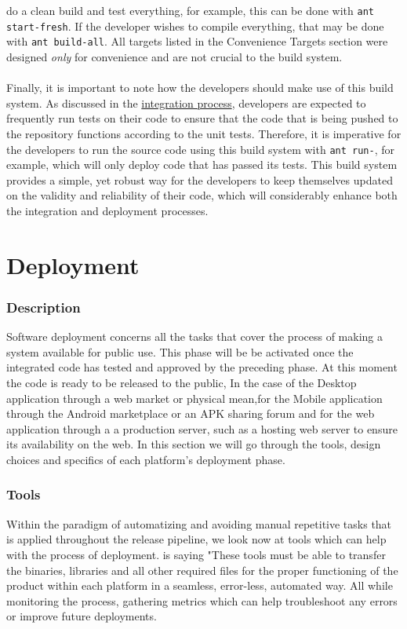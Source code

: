 \documentclass[12pt]{report}
\begin{document}
do a clean build and test everything, for example, this can be done with \texttt{ant start-fresh}.
If the developer wishes to compile everything, that may be done with \texttt{ant build-all}. All
targets listed in the Convenience Targets section were designed \textit{only} for convenience and
are not crucial to the build system.\\\\
Finally, it is important to note how the developers should make use of this build system. As
discussed in the \hyperref[s:integrationprocessrationale]{integration process}, developers are
expected to frequently run tests on their code to ensure that the code that is being pushed to the
repository functions according to the unit tests. Therefore, it is imperative for the developers to
run the source code using this build system with \texttt{ant run-}, for example, which will only
deploy code that has passed its tests. This build system provides a simple, yet robust way for the
developers to keep themselves updated on the validity and reliability of their code, which will
considerably enhance both the integration and deployment processes.
\part{Deployment}
\section{Description}
Software deployment concerns all the tasks that cover the process of making a system available for public use.
This phase will be be activated once the integrated code has tested and approved by the preceding
phase. At this moment the code is ready to be released to the public, In the case of the Desktop
application through a web market or physical mean,for the Mobile application through the Android
marketplace or an APK sharing forum and for the web application through a a production server, such
as a hosting web server to ensure its availability on the web. In this section we will go through
the tools, design choices and specifics of each platform's deployment phase.

\section{Tools}
Within the paradigm of automatizing and avoiding manual repetitive tasks that is applied throughout the release pipeline, we look now at tools which can help with the process of deployment. is saying "These tools must be able to transfer the binaries, libraries and all other required files for the proper functioning of the product within each platform in a seamless, error-less, automated way. All while monitoring the process, gathering metrics which can help troubleshoot any errors or improve future deployments.
\end{document}
